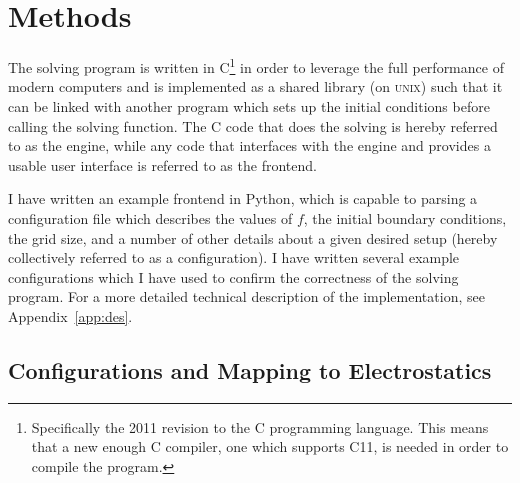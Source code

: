 \section{Methods}

The solving program is written in C\footnote{Specifically the 2011 revision to the C programming language. This means that a new enough
C compiler, one which supports C11, is needed in order to compile the program.} in order to leverage the full performance of modern computers and is implemented
as a shared library (on \textsc{unix}) such that it can be linked with another program which sets up the initial conditions
before calling the solving function. The C code that does the solving is hereby referred to as the engine, while any code
that interfaces with the engine and provides a usable user interface is referred to as the frontend.

I have written an example frontend in Python, which is capable to parsing a configuration file which describes the
values of $f$, the initial boundary conditions, the grid size, and a number of other details about a given desired
setup (hereby collectively referred to as a configuration). I have written several example configurations which I have used to
confirm the correctness of the solving program. For a more detailed technical description of the implementation, see Appendix~\ref{app:des}.









\subsection{Configurations and Mapping to Electrostatics}

